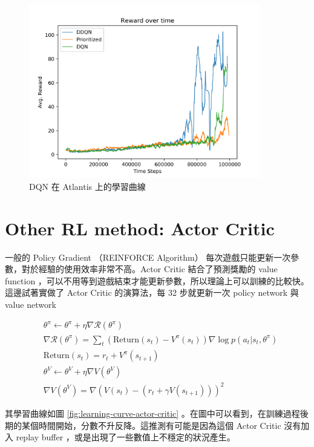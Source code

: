 \documentclass[fleqn,a4paper,12pt]{article}
\begin{document}
\begin{figure}[h]
  \centering
  \includegraphics[width=0.9\textwidth]{figures/atlantis.png}
  \caption{DQN 在 Atlantis 上的學習曲線}
  \label{fig:learning-curve-dqn-atlantis}
\end{figure}




\section{Other RL method: Actor Critic}

一般的 Policy Gradient （REINFORCE Algorithm） 每次遊戲只能更新一次參數，對於經驗的使用效率非常不高。Actor Critic 結合了預測獎勵的 value function ，可以不用等到遊戲結束才能更新參數，所以理論上可以訓練的比較快。這邊試著實做了 Actor Critic 的演算法，每 32 步就更新一次 policy network 與 value network

\begin{align*}
  & \theta^{\pi} \leftarrow \theta^{\pi} + \eta \nabla \mathcal{R}(\theta^\pi) \\
  & \nabla \mathcal{R}(\theta^\pi) = \sum_t (\mathrm{Return}(s_t) - V^\pi(s_t)) \nabla \log p(a_t | s_t, \theta^\pi) \\
  & \mathrm{Return}(s_t) = r_t + V^\pi(s_{t+1}) \\
  & \theta^{V} \leftarrow \theta^{V} + \eta \nabla V(\theta^V) \\
  & \nabla V(\theta^V) = \nabla (V(s_t) - (r_t + \gamma V(s_{t+1})))^2 
\end{align*}

其學習曲線如圖 \ref{fig:learning-curve-actor-critic} 。在圖中可以看到，在訓練過程後期的某個時間開始，分數不升反降。這推測有可能是因為這個 Actor Critic 沒有加入 replay buffer ，或是出現了一些數值上不穩定的狀況產生。
\end{document}
